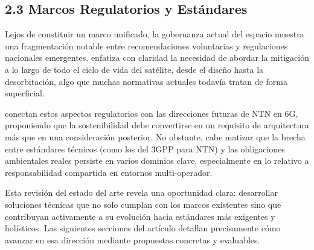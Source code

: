\subsection{2.3 Marcos Regulatorios y Estándares}

Lejos de constituir un marco unificado, la gobernanza actual del espacio muestra una fragmentación notable entre recomendaciones voluntarias y regulaciones nacionales emergentes. \cite{Bennett2025} enfatiza con claridad la necesidad de abordar la mitigación a lo largo de todo el ciclo de vida del satélite, desde el diseño hasta la desorbitación, algo que muchas normativas actuales todavía tratan de forma superficial.

\cite{Wang2025} conectan estos aspectos regulatorios con las direcciones futuras de NTN en 6G, proponiendo que la sostenibilidad debe convertirse en un requisito de arquitectura más que en una consideración posterior. No obstante, cabe matizar que la brecha entre estándares técnicos (como los del 3GPP para NTN) y las obligaciones ambientales reales persiste en varios dominios clave, especialmente en lo relativo a responsabilidad compartida en entornos multi-operador.

Esta revisión del estado del arte revela una oportunidad clara: desarrollar soluciones técnicas que no solo cumplan con los marcos existentes sino que contribuyan activamente a su evolución hacia estándares más exigentes y holísticos. Las siguientes secciones del artículo detallan precisamente cómo avanzar en esa dirección mediante propuestas concretas y evaluables.